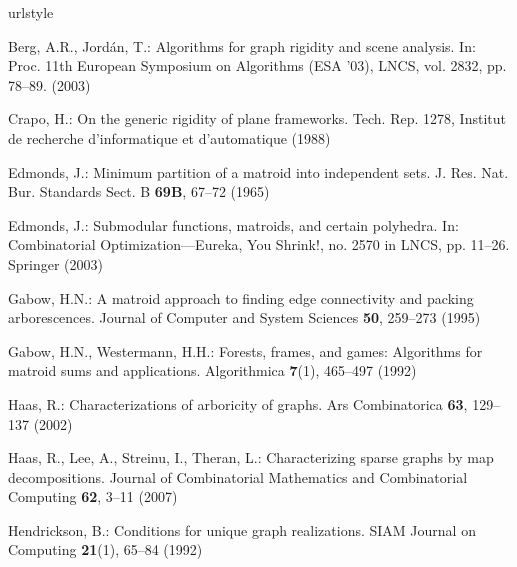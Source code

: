 \documentclass[Svgc,nospthms]{Svgc}
\begin{document}
\begin{thebibliography}{21}
\providecommand{\natexlab}[1]{#1}
\providecommand{\url}[1]{#1}
\providecommand{\urlprefix}{URL }
\expandafter\ifx\csname urlstyle\endcsname\relax
  \providecommand{\doi}[1]{DOI~\discretionary{}{}{}#1}\else
  \providecommand{\doi}{DOI~\discretionary{}{}{}\begingroup
  \urlstyle{rm}\Url}\fi

Berg, A.R., Jord\'{a}n, T.: Algorithms for graph rigidity and scene analysis.
\newblock In: Proc. 11th European Symposium on Algorithms (ESA '03), LNCS, vol. 2832, pp. 78--89.  (2003)

Crapo, H.: On the generic rigidity of plane frameworks.
\newblock Tech. Rep. 1278, Institut de recherche d'informatique et
  d'automatique (1988)

Edmonds, J.: Minimum partition of a matroid into independent sets.
\newblock J. Res. Nat. Bur. Standards Sect. B \textbf{69B}, 67--72 (1965)

Edmonds, J.: Submodular functions, matroids, and certain polyhedra.
\newblock In: Combinatorial Optimization---Eureka, You Shrink!, no. 2570 in
  LNCS, pp. 11--26. Springer (2003)

Gabow, H.N.: A matroid approach to finding edge connectivity and packing
  arborescences.
\newblock Journal of Computer and System Sciences \textbf{50}, 259--273 (1995)

Gabow, H.N., Westermann, H.H.: Forests, frames, and games: Algorithms for
  matroid sums and applications.
\newblock Algorithmica \textbf{7}(1), 465--497 (1992)

Haas, R.: Characterizations of arboricity of graphs.
\newblock Ars Combinatorica \textbf{63}, 129--137 (2002)

Haas, R., Lee, A., Streinu, I., Theran, L.: Characterizing sparse graphs by map
  decompositions.
\newblock Journal of Combinatorial Mathematics and Combinatorial Computing
  \textbf{62}, 3--11 (2007)

Hendrickson, B.: Conditions for unique graph realizations.
\newblock SIAM Journal on Computing \textbf{21}(1), 65--84 (1992)


\end{thebibliography}
\end{document}
